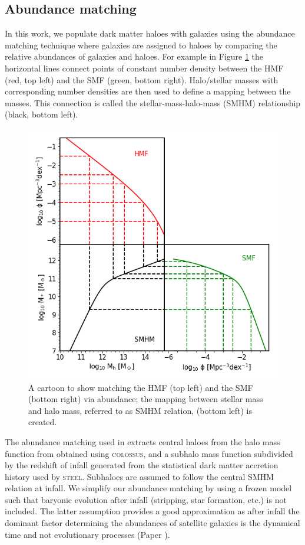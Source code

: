 \subsection{Abundance matching}
\label{C2:SubSec:AbnMtch}
In this work, we populate dark matter haloes with galaxies using the abundance matching technique where galaxies are assigned to haloes by comparing the relative abundances of galaxies and haloes. For example in Figure \ref{fig:Abn_Toon} the horizontal lines connect points of constant number density between the HMF (red, top left) and the SMF (green, bottom right). Halo/stellar masses with corresponding number densities are then used to define a mapping between the masses. This connection is called the stellar-mass-halo-mass (SMHM) relationship (black, bottom left).

\begin{figure}[h]
    \centering
    \includegraphics[width = \linewidth]{Figures/Chapter2/AbundaceMatching.png}
    \caption{A cartoon to show matching the HMF (top left) and the SMF (bottom right) via abundance; the mapping between stellar mass and halo mass, referred to as SMHM relation, (bottom left) is created.}
    \label{fig:Abn_Toon}
\end{figure}

The abundance matching used in \steel extracts central haloes from the halo mass function from \citet{Despali2016TheDefinitions} obtained using \textsc{colossus}\cite{Diemer2018COLOSSUS:Halos}, and a subhalo mass function subdivided by the redshift of infall generated from the statistical dark matter accretion history used by \textsc{steel}. Subhaloes are assumed to follow the central SMHM relation at infall. We simplify our abundance matching by using a frozen model such that baryonic evolution after infall (stripping, star formation, etc.) is not included. The latter assumption provides a good approximation as after infall the dominant factor determining the abundances of satellite galaxies is the dynamical time and not evolutionary processes (Paper ).

